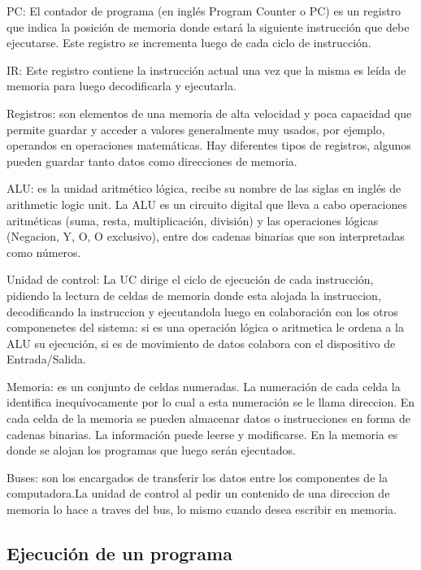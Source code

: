 PC: El contador de programa (en inglés Program Counter o PC) es un registro que indica la posición de memoria donde estará la siguiente instrucción que debe ejecutarse. Este registro se incrementa luego de cada ciclo de instrucción.

IR: Este registro contiene la instrucción actual una vez que la misma es leída de memoria para luego decodificarla y ejecutarla.

Registros: son elementos de una memoria de alta velocidad y poca capacidad que permite guardar y acceder a valores generalmente muy usados, por ejemplo, operandos en operaciones matemáticas. Hay diferentes tipos de registros, algunos pueden guardar tanto datos como direcciones de memoria.

ALU: es la unidad aritmético lógica, recibe su nombre de las siglas en inglés de arithmetic logic unit. La ALU es un circuito digital que lleva a cabo operaciones aritméticas (suma, resta, multiplicación, división) y las operaciones lógicas (Negacion, Y, O, O exclusivo), entre dos cadenas binarias que son interpretadas como números. 

Unidad de control: La UC dirige el ciclo de ejecución de cada instrucción, pidiendo la lectura de celdas de memoria donde esta alojada la instruccion, decodificando la instruccion y ejecutandola luego en colaboración con los otros componenetes del sistema: si es una operación lógica o aritmetica le ordena a la ALU su ejecución, si es de movimiento de datos colabora con el dispositivo de Entrada/Salida.

Memoria: es un conjunto de celdas numeradas. La numeración de cada celda la identifica inequívocamente por lo cual a esta numeración se le llama direccion. En cada celda de la memoria se pueden almacenar datos o instrucciones en forma de cadenas binarias. La información puede leerse y modificarse. En la memoria es donde se alojan los programas que luego serán ejecutados.

Buses: son los encargados de transferir los datos entre los componentes de la computadora.La unidad de control al pedir un contenido de una direccion de memoria lo hace a traves del bus, lo mismo cuando desea escribir en memoria.

\subsection{Ejecución de un programa}

